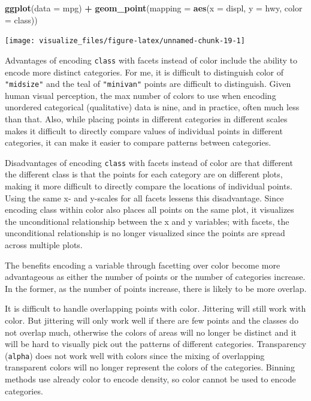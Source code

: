\documentclass[]{book}
\newenvironment{Shaded}{\begin{snugshade}}{\end{snugshade}}
\newcommand{\DataTypeTok}[1]{\textcolor[rgb]{0.13,0.29,0.53}{#1}}
\newcommand{\KeywordTok}[1]{\textcolor[rgb]{0.13,0.29,0.53}{\textbf{#1}}}
\newcommand{\NormalTok}[1]{#1}
\newcommand{\OperatorTok}[1]{\textcolor[rgb]{0.81,0.36,0.00}{\textbf{#1}}}
\newcommand{\StringTok}[1]{\textcolor[rgb]{0.31,0.60,0.02}{#1}}
\theoremstyle{plain}
\theoremstyle{remark}
\begin{document}
\begin{Shaded}
\begin{Highlighting}[]
\KeywordTok{ggplot}\NormalTok{(}\DataTypeTok{data =}\NormalTok{ mpg) }\OperatorTok{+}
\StringTok{  }\KeywordTok{geom_point}\NormalTok{(}\DataTypeTok{mapping =} \KeywordTok{aes}\NormalTok{(}\DataTypeTok{x =}\NormalTok{ displ, }\DataTypeTok{y =}\NormalTok{ hwy, }\DataTypeTok{color =}\NormalTok{ class))}
\end{Highlighting}
\end{Shaded}

\begin{center}\texttt{[image: visualize\_files/figure-latex/unnamed-chunk-19-1]} \end{center}

Advantages of encoding \texttt{class} with facets instead of color include the
ability to encode more distinct categories.
For me, it is difficult to distinguish color of \texttt{"midsize"} and the teal of \texttt{"minivan"} points are difficult to distinguish.
Given human visual perception, the max number of colors to use when encoding
unordered categorical (qualitative) data is nine, and in practice, often much less
than that.
Also, while placing points in different categories in different scales makes
it difficult to directly compare values of individual points in different categories, it can make it easier to compare patterns between categories.

Disadvantages of encoding \texttt{class} with facets instead of color are that different
the different class is that the points for each category are on different plots,
making it more difficult to directly compare the locations of individual points.
Using the same x- and y-scales for all facets lessens this disadvantage.
Since encoding class within color also places all points on the same plot,
it visualizes the unconditional relationship between the x and y variables;
with facets, the unconditional relationship is no longer visualized since the
points are spread across multiple plots.

The benefits encoding a variable through facetting over color become more advantageous as either the number of points or the number of categories increase.
In the former, as the number of points increase, there is likely to be more
overlap.

It is difficult to handle overlapping points with color.
Jittering will still work with color.
But jittering will only work well if there are few points and the classes do not overlap much, otherwise the colors of areas will no longer be distinct and it will be hard to visually pick out the patterns of different categories.
Transparency (\texttt{alpha}) does not work well with colors since the mixing of overlapping transparent colors will no longer represent the colors of the categories.
Binning methods use already color to encode density, so color cannot be used to encode categories.
\end{document}
